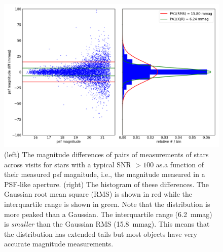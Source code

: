 \documentclass[\docopts]{\docclass}
\begin{document}
\begin{figure}
\centering
\includegraphics[width=0.9\columnwidth]{DC1-imsim-dithered_r_PA1.png}
\caption{(left) The magnitude differences of pairs of measurements of stars across visits for stars with a typical SNR $>100$ as.a function of their measured psf magnitude, i.e., the magnitude measured in a PSF-like aperture.  (right) The histogram of these differences.  The Gaussian root mean square (RMS) is shown in red while the interquartile range is shown in green. Note that the distribution is more peaked than a Gaussian. The interquartile range (6.2~mmag) is {\em smaller} than the Gaussian RMS (15.8~mmag). This means that the distribution has extended tails but most objects have very accurate magnitude measurements.}
\label{fig:validate_drp_PA1}
\end{figure}
\end{document}
